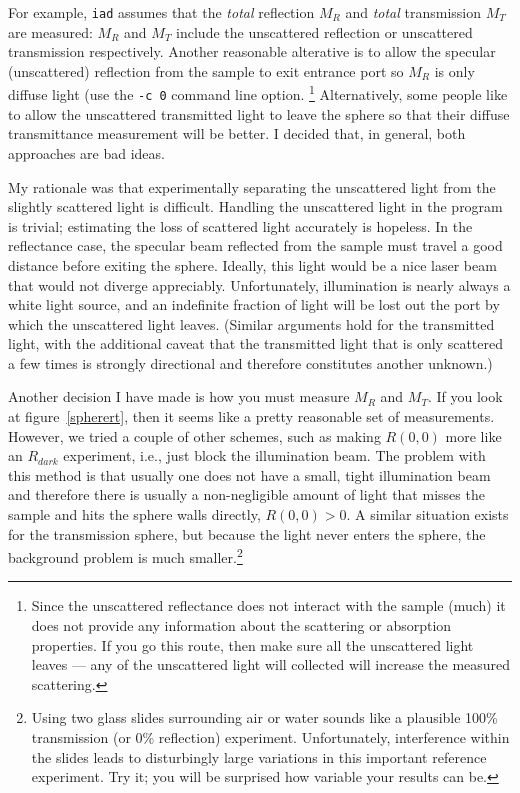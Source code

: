 \documentclass{article}
\newcommand\iadprog{\texttt{iad}}
\begin{document}
For example, \iadprog{} assumes that the \textit{total} reflection $M_R$
and \textit{total} transmission $M_T$ are measured: $M_R$ and $M_T$ include
the unscattered reflection or unscattered transmission respectively.  
Another reasonable alterative is to allow the specular (unscattered) reflection from the sample
to exit entrance port so $M_R$ is only diffuse light (use the \texttt{-c 0} command
line option.%
\footnote{Since the unscattered reflectance does not interact with the sample (much)
it does not provide any information about the scattering or
absorption properties.  If you go this route, then make sure all the unscattered
light leaves --- any of the unscattered light will collected will increase 
the measured scattering.}
  Alternatively, 
some people like to allow the unscattered transmitted light to
leave the sphere so that their diffuse transmittance measurement will be
better.  I decided that, in general, both approaches are bad ideas.

My rationale was that experimentally separating the unscattered light
from the slightly scattered light is difficult.  Handling the unscattered
light in the program is trivial; estimating the loss of scattered light
accurately is hopeless.  In the reflectance case, the specular beam
reflected from the sample must travel a good distance before exiting the
sphere.  Ideally, this light would be a nice laser beam that would not
diverge appreciably.  Unfortunately, illumination is nearly always
a white light source, and an indefinite fraction of light will be lost out
the port by which the unscattered light leaves.
(Similar arguments hold for the transmitted light, with the additional
caveat that the transmitted light that is only scattered a few times
is strongly directional and therefore constitutes another unknown.)

Another decision I have made is how you must measure $M_R$ and $M_T$.  If
you look at figure~\ref{spherert}, then it seems like a pretty reasonable
set of measurements.  However, we tried a couple of other schemes, such as
making $R(0,0)$ more like an $R_\mathit{dark}$ experiment, i.e., just block
the illumination beam.  The problem with this method is that usually
one does not have a small, tight illumination beam and therefore there is
usually a non-negligible amount of light that misses the sample and hits
the sphere walls directly, $R(0,0) > 0$.  A similar situation exists for
the transmission sphere, but because the light never enters the sphere,
the background problem is much smaller.\footnote{Using two
glass slides surrounding air or water sounds like a plausible 100\%
transmission (or 0\% reflection) experiment.  Unfortunately, interference within the slides
leads to disturbingly large variations in this important reference
experiment. Try it; you will be surprised how variable your results
can be.}
\end{document}
